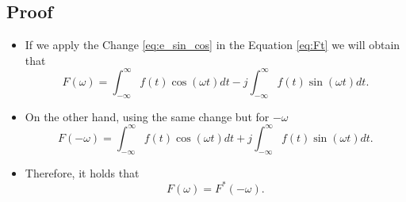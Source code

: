 \subsection*{Proof}
\begin{itemize}
\item If we apply the Change \ref{eq:e_sin_cos} in the Equation
  \ref{eq:Ft} we will obtain that
  \begin{displaymath}
    F(\omega) = \int_{-\infty}^{\infty} f(t)\cos(\omega t)dt-j\int_{-\infty}^{\infty}
    f(t)\sin(\omega t)dt.
  \end{displaymath}
\item On the other hand, using the same change but for $-\omega$
  \begin{displaymath}
    F(-\omega) = \int_{-\infty}^{\infty} f(t)\cos(\omega t)dt+j\int_{-\infty}^{\infty}
    f(t)\sin(\omega t)dt.
  \end{displaymath}
\item Therefore, it holds that
  \begin{displaymath}
    F(\omega)=F^*(-\omega).
  \end{displaymath}
\end{itemize}

